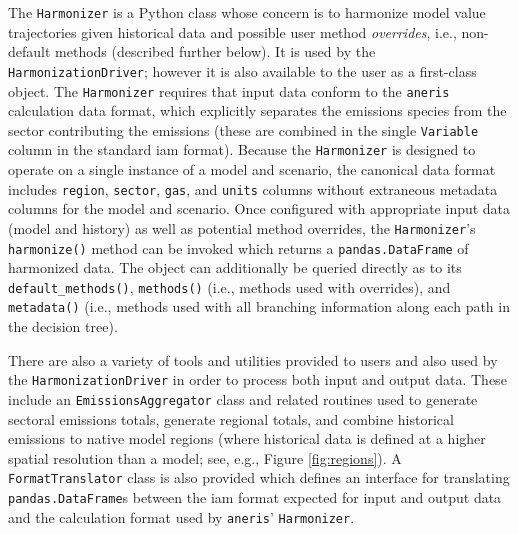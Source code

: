 \documentclass[review]{elsarticle}
\newcommand{\code}[1]{\lstinline[basicstyle=\ttfamily\color{black}]|#1|}
\begin{document}
The \texttt{Harmonizer} is a Python class whose concern is to harmonize model
value trajectories given historical data and possible user method
\textit{overrides}, i.e., non-default methods (described further below). It is
used by the \texttt{HarmonizationDriver}; however it is also available to the
user as a first-class object. The \texttt{Harmonizer} requires that input data
conform to the \code{aneris} calculation data format, which explicitly separates
the emissions species from the sector contributing the emissions (these are
combined in the single \code{Variable} column in the standard \gls{iam}
format). Because the \texttt{Harmonizer} is designed to operate on a single
instance of a model and scenario, the canonical data format includes
\texttt{region}, \texttt{sector}, \texttt{gas}, and \texttt{units} columns
without extraneous metadata columns for the model and scenario. Once configured
with appropriate input data (model and history) as well as potential method
overrides, the \texttt{Harmonizer}'s \texttt{harmonize()} method can be invoked
which returns a \texttt{pandas.DataFrame} of harmonized data. The object can
additionally be queried directly as to its \texttt{default\_methods()},
\texttt{methods()} (i.e., methods used with overrides), and \texttt{metadata()}
(i.e., methods used with all branching information along each path in the
decision tree).

There are also a variety of tools and utilities provided to users and also used
by the \texttt{HarmonizationDriver} in order to process both input and output
data. These include an \texttt{EmissionsAggregator} class and related routines
used to generate sectoral emissions totals, generate regional totals, and
combine historical emissions to native model regions (where historical data is
defined at a higher spatial resolution than a model; see, e.g., Figure
\ref{fig:regions}). A \texttt{FormatTranslator} class is also provided which
defines an interface for translating \texttt{pandas.DataFrame}s between the \gls{iam}
format expected for input and output data and the calculation format used by
\code{aneris}' \texttt{Harmonizer}.
\end{document}

